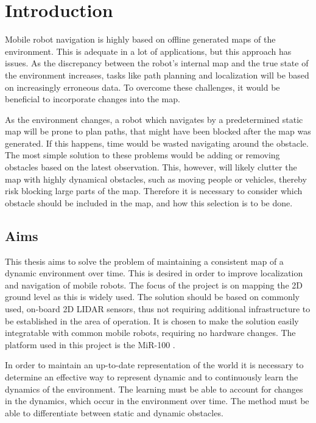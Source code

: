 \chapter{Introduction}

Mobile robot navigation is highly based on offline generated maps of the environment. 
This is adequate in a lot of applications, but this approach has issues. 
As the discrepancy between the robot's internal map and the true state of the environment increases, tasks like path planning and localization will be based on increasingly erroneous data. 
To overcome these challenges, it would be beneficial to incorporate changes into the map.

As the environment changes, a robot which navigates by a predetermined static map will be prone to plan paths, that might have been blocked after the map was generated. 
If this happens, time would be wasted navigating around the obstacle.
The most simple solution to these problems would be adding or removing obstacles based on the latest observation. This, however, will likely clutter the map with highly dynamical obstacles, such as moving people or vehicles, thereby risk blocking large parts of the map. 
Therefore it is necessary to consider which obstacle should be included in the map, and how this selection is to be done.

\section{Aims}
This thesis aims to solve the problem of maintaining a consistent map of a dynamic environment over time. 
This is desired in order to improve localization and navigation of mobile robots. 
The focus of the project is on mapping the 2D ground level as this is widely used. 
The solution should be based on commonly used, on-board 2D LIDAR sensors, thus not requiring additional infrastructure to be established in the area of operation. 
It is chosen to make the solution easily integratable with common mobile robots, requiring no hardware changes. 
The platform used in this project is the MiR-100 \cite{mir-100-platform}.

In order to maintain an up-to-date representation of the world it is necessary to determine an effective way to represent dynamic and to continuously learn the dynamics of the environment. 
The learning must be able to account for changes in the dynamics, which occur in the environment over time. 
The method must be able to differentiate between static and dynamic obstacles.

